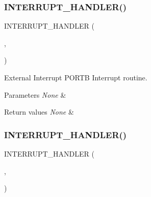 \subsubsection{\texorpdfstring{I\+N\+T\+E\+R\+R\+U\+P\+T\+\_\+\+H\+A\+N\+D\+L\+E\+R()}{INTERRUPT\_HANDLER()}\hspace{0.1cm}{\footnotesize\ttfamily [5/16]}}
{\footnotesize\ttfamily I\+N\+T\+E\+R\+R\+U\+P\+T\+\_\+\+H\+A\+N\+D\+L\+ER (\begin{DoxyParamCaption}\item[{E\+X\+T\+I\+\_\+\+P\+O\+R\+T\+B\+\_\+\+I\+R\+Q\+Handler}]{,  }\item[{4}]{ }\end{DoxyParamCaption})}



External Interrupt P\+O\+R\+TB Interrupt routine. 


\begin{DoxyParams}{Parameters}
{\em None} & \\
\hline
\end{DoxyParams}

\begin{DoxyRetVals}{Return values}
{\em None} & \\
\hline
\end{DoxyRetVals}
\mbox{\label{group___u_a_r_t1___printf_gacc23dfa2a45b3af59288c92b043a7e78}} 
\subsubsection{\texorpdfstring{I\+N\+T\+E\+R\+R\+U\+P\+T\+\_\+\+H\+A\+N\+D\+L\+E\+R()}{INTERRUPT\_HANDLER()}\hspace{0.1cm}{\footnotesize\ttfamily [6/16]}}
{\footnotesize\ttfamily I\+N\+T\+E\+R\+R\+U\+P\+T\+\_\+\+H\+A\+N\+D\+L\+ER (\begin{DoxyParamCaption}\item[{E\+X\+T\+I\+\_\+\+P\+O\+R\+T\+C\+\_\+\+I\+R\+Q\+Handler}]{,  }\item[{5}]{ }\end{DoxyParamCaption})}




